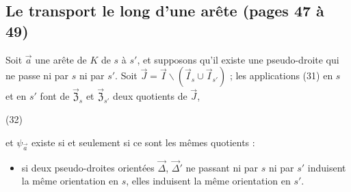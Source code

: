 \documentclass[11pt,a4paper]{article}
\begin{document}
\subsection*{Le transport le long d'une arête (pages 47 à 49)}

Soit $\vec{a}$ une arête de $K$ de $s$ à $s'$, et supposons qu'il existe une
pseudo-droite qui ne passe ni par $s$ ni par $s'$. Soit $\vec{J} = \vec{I}
\smallsetminus (\vec{I}_s \cup \vec{I}_{s'})$ ; les applications (31) en $s$
et en $s'$ font de $\vec{\mathfrak{Z}}_s$ et $\vec{\mathfrak{Z}}_{s'}$ deux
quotients de $\vec{J}$,

(32)


et $\psi_{\vec{a}}$ existe si et seulement si ce sont les mêmes quotients :
\begin{itemize}
  \item[(A4)] si deux pseudo-droites orientées $\vec{\Delta}$, $\vec{\Delta}'$ ne
  passant ni par $s$ ni par $s'$ induisent la même orientation en $s$, elles
  induisent la même orientation en $s'$.
\end{itemize}
\end{document}
